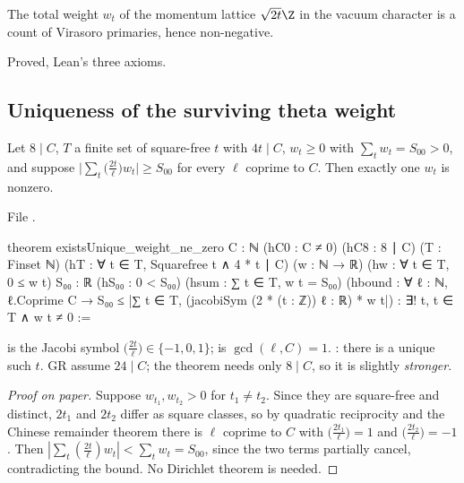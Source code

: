 \begin{physics}
The total weight $w_t$ of the momentum lattice $\sqrt{2t}\Z$ in the vacuum character is a count of Virasoro
primaries, hence non-negative.
\end{physics}

\begin{status}
Proved, Lean's three axioms.
\end{status}

\subsection{Uniqueness of the surviving theta weight}

\begin{theorem}\label{l22:thm:unique}
Let $8\mid C$, $T$ a finite set of square-free $t$ with $4t\mid C$, $w_t\ge0$ with $\sum_tw_t=S_{00}>0$, and
suppose $\bigl|\sum_t\bigl(\tfrac{2t}{\ell}\bigr)w_t\bigr|\ge S_{00}$ for every $\ell$ coprime to $C$. Then exactly one
$w_t$ is nonzero.
\end{theorem}
\noindent File .
\begin{leancode}
theorem existsUnique_weight_ne_zero {C : ℕ} (hC0 : C ≠ 0) (hC8 : 8 ∣ C) (T : Finset ℕ)
    (hT : ∀ t ∈ T, Squarefree t ∧ 4 * t ∣ C) (w : ℕ → ℝ) (hw : ∀ t ∈ T, 0 ≤ w t) {S₀₀ : ℝ}
    (hS₀₀ : 0 < S₀₀) (hsum : ∑ t ∈ T, w t = S₀₀)
    (hbound : ∀ ℓ : ℕ, ℓ.Coprime C →
      S₀₀ ≤ |∑ t ∈ T, (jacobiSym (2 * (t : ℤ)) ℓ : ℝ) * w t|) :
    ∃! t, t ∈ T ∧ w t ≠ 0 :=
\end{leancode}

\begin{dictionary}
 is the Jacobi symbol $\bigl(\tfrac{2t}{\ell}\bigr)\in\{-1,0,1\}$; 
is $\gcd(\ell,C)=1$. : there is a unique such $t$. GR assume $24\mid C$; the theorem
needs only $8\mid C$, so it is slightly \emph{stronger}.
\end{dictionary}

\begin{proof}[Proof on paper]
Suppose $w_{t_1},w_{t_2}>0$ for $t_1\ne t_2$. Since they are square-free and distinct, $2t_1$ and $2t_2$ differ as
square classes, so by quadratic reciprocity and the Chinese remainder theorem there is $\ell$ coprime to $C$ with
$\bigl(\tfrac{2t_1}{\ell}\bigr)=1$ and $\bigl(\tfrac{2t_2}{\ell}\bigr)=-1$. Then
$|\sum_t(\tfrac{2t}{\ell})w_t|<\sum_tw_t=S_{00}$, since the two terms partially cancel, contradicting the bound.
No Dirichlet theorem is needed.
\end{proof}

